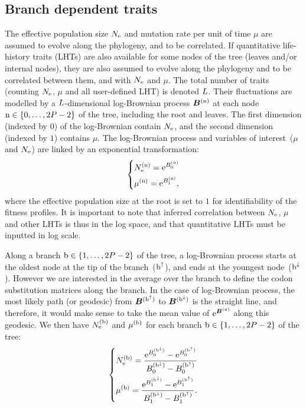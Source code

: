 \subsection{Branch dependent traits}
The \gls{effective population size} $N_{\text{e}}$ and mutation rate per unit of time $\mu$ are assumed to evolve along the phylogeny, and to be correlated.
If quantitative life-history traits (\acrshort{LHT}s) are also available for some nodes of the tree (leaves and/or internal nodes), they are also assumed to evolve along the phylogeny and to be correlated between them, and with $N_{\text{e}}$ and $\mu$.
The total number of traits (counting $N_{\text{e}}$, $\mu$ and all user-defined LHT) is denoted $L$.
Their fluctuations are modelled by a $L$-dimensional log-Brownian process $\bm{B}^{(\text{n})}$ at each node $\text{n} \in \{0, \hdots, 2 P - 2\}$ of the tree, including the root and leaves.
The first dimension (indexed by $0$) of the log-Brownian contain $N_{\text{e}}$, and the second dimension (indexed by $1$) contains $\mu$.
The log-Brownian process and variables of interest~($\mu$ and $N_{\text{e}}$) are linked by an exponential transformation:
\begin{equation}
    \begin{dcases}
        N_{\text{e}}^{(\text{n})} = \text{e}^{ B_{0}^{(\text{n})} } \\
        \mu^{(\text{n})} = \text{e}^{ B_{1}^{(\text{n})} },
    \end{dcases}
\end{equation}
where the \gls{effective population size} at the root is set to $1$ for identifiability of the fitness profiles.
It is important to note that inferred correlation between $N_{\text{e}}$, $\mu$ and other \acrshort{LHT}s is thus in the log space, and that quantitative \acrshort{LHT}s must be inputted in log scale.

Along a branch $\text{b} \in \{1, \hdots, 2 P - 2\}$ of the tree, a log-Brownian process starts at the oldest node at the tip of the branch~($\text{b}^{\uparrow}$), and ends at the youngest node~($\text{b}^{\downarrow}$).
However we are interested in the average over the branch to define the \gls{codon} \gls{substitution} matrices along the branch.
In the case of log-Brownian process, the most likely path (or geodesic) from $\bm{B}^{(\text{b}^{\uparrow})}$ to $\bm{B}^{(\text{b}^{\downarrow})}$ is the straight line, and therefore, it would make sense to take the mean value of $\text{e}^{\bm{B}^{(\text{n})}}$ along this geodesic.
We then have $N_{\text{e}}^{(\text{b})}$ and $\mu^{(\text{b})}$ for each branch $\text{b} \in \{1, \hdots, 2 P - 2\}$ of the tree:
\begin{equation}
    \label{eq:branchNemu}
    \begin{dcases}
        \Ne\branchexp = \dfrac{\e^{\brownian_{0}^{(\nodeDown)}} - \e^{\brownian_{0}^{(\nodeUp)}}}{\brownian_{0}^{(\nodeDown)} - \brownian_{0}^{(\nodeUp)}} \\
        \mu\branchexp = \dfrac{\e^{\brownian_{1}^{(\nodeDown)}} - \e^{\brownian_{1}^{(\nodeUp)}}}{\brownian_{1}^{(\nodeDown)} - \brownian_{1}^{(\nodeUp)}}.
    \end{dcases}
\end{equation}


